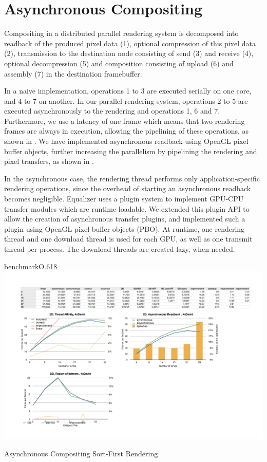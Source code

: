 \section{Asynchronous Compositing}

Compositing in a distributed parallel rendering system is decomposed into
readback of the produced pixel data (1), optional compression of this pixel data
(2), transmission to the destination node consisting of send (3) and receive
(4), optional decompression (5) and composition consisting of upload (6) and
assembly (7) in the destination framebuffer.

In a naive implementation, operations 1 to 3 are executed serially on one
core, and 4 to 7 on another. In our parallel rendering system, operations 2
to 5 are executed asynchronously to the rendering and operations 1, 6 and 7.
Furthermore, we use a latency of one frame which means that two rendering frames
are always in execution, allowing the pipelining of these operations, as shown
in . We have implemented asynchronous readback using OpenGL pixel
buffer objects, further increasing the parallelism by pipelining the rendering
and pixel transfers, as shown in .

In the asynchronous case, the rendering thread performs only
application-specific rendering operations, since the overhead of starting an
asynchronous readback becomes negligible. Equalizer uses a plugin system to
implement GPU-CPU transfer modules which are runtime loadable. We extended this
plugin API to allow the creation of asynchronous transfer plugins, and
implemented such a plugin using OpenGL pixel buffer objects (PBO). At runtime,
one rendering thread and one download thread is used for each GPU, as well as
one transmit thread per process. The download threads are created lazy, when
needed.

\begin{wrapfloat}{benchmark}{O}{.618\textwidth}
 \includegraphics[width=.618\textwidth]{results/async}
 {\caption{\label{rAsync}Asynchronous Compositing Sort-First Rendering}}
\end{wrapfloat}

